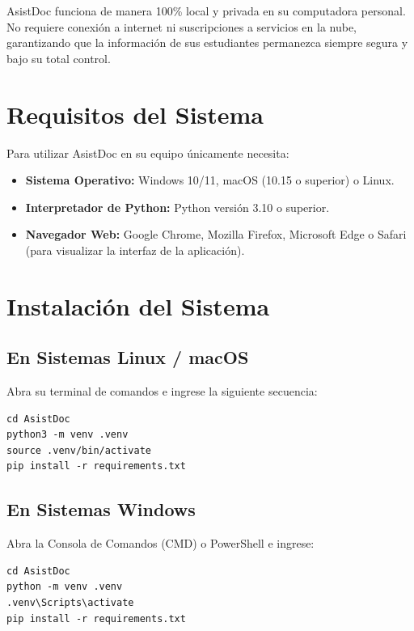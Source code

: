 \documentclass[12pt,a4paper]{article}
\begin{document}
AsistDoc funciona de manera 100\% local y privada en su computadora personal. No requiere conexión a internet ni suscripciones a servicios en la nube, garantizando que la información de sus estudiantes permanezca siempre segura y bajo su total control.

\section{Requisitos del Sistema}
Para utilizar AsistDoc en su equipo únicamente necesita:
\begin{itemize}
    \item \textbf{Sistema Operativo:} Windows 10/11, macOS (10.15 o superior) o Linux.
    \item \textbf{Interpretador de Python:} Python versión 3.10 o superior.
    \item \textbf{Navegador Web:} Google Chrome, Mozilla Firefox, Microsoft Edge o Safari (para visualizar la interfaz de la aplicación).
\end{itemize}

\section{Instalación del Sistema}

\subsection{En Sistemas Linux / macOS}
Abra su terminal de comandos e ingrese la siguiente secuencia:
\begin{verbatim}
cd AsistDoc
python3 -m venv .venv
source .venv/bin/activate
pip install -r requirements.txt
\end{verbatim}

\subsection{En Sistemas Windows}
Abra la Consola de Comandos (CMD) o PowerShell e ingrese:
\begin{verbatim}
cd AsistDoc
python -m venv .venv
.venv\Scripts\activate
pip install -r requirements.txt
\end{verbatim}
\end{document}
